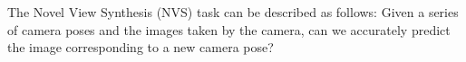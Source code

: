 The Novel View Synthesis (NVS) task can be described as follows: Given a series of camera poses and the images taken by the camera, can we accurately predict the image corresponding to a new camera pose?
